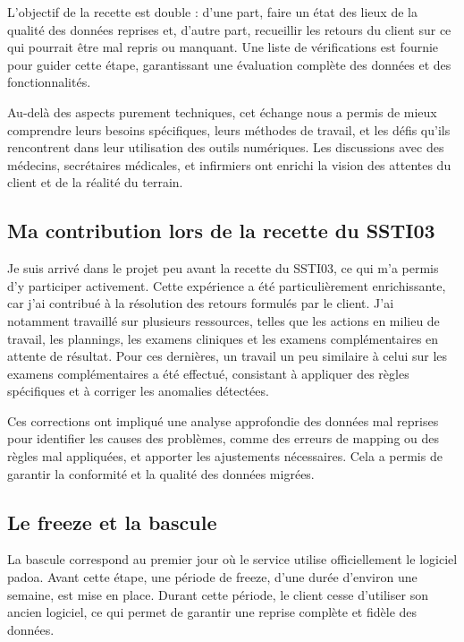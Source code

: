 L’objectif de la recette est double : d’une part, faire un état des lieux de la qualité des données reprises et, d’autre part, recueillir les retours du client sur ce qui pourrait être mal repris ou manquant. Une liste de vérifications est fournie pour guider cette étape, garantissant une évaluation complète des données et des fonctionnalités.

Au-delà des aspects purement techniques, cet échange nous a permis de mieux comprendre leurs besoins spécifiques, leurs méthodes de travail, et les défis qu'ils rencontrent dans leur utilisation des outils numériques. Les discussions avec des médecins, secrétaires médicales, et infirmiers ont enrichi la vision des attentes du client et de la réalité du terrain.

\subsection{Ma contribution lors de la recette du SSTI03}

Je suis arrivé dans le projet peu avant la recette du SSTI03, ce qui m’a permis d’y participer activement. Cette expérience a été particulièrement enrichissante, car j’ai contribué à la résolution des retours formulés par le client. J’ai notamment travaillé sur plusieurs ressources, telles que les actions en milieu de travail, les plannings, les examens cliniques et les examens complémentaires en attente de résultat. Pour ces dernières, un travail un peu similaire à celui sur les examens complémentaires a été effectué, consistant à appliquer des règles spécifiques et à corriger les anomalies détectées.

Ces corrections ont impliqué une analyse approfondie des données mal reprises pour identifier les causes des problèmes, comme des erreurs de mapping ou des règles mal appliquées, et apporter les ajustements nécessaires. Cela a permis de garantir la conformité et la qualité des données migrées.

\subsection{Le freeze et la bascule}

La bascule correspond au premier jour où le service utilise officiellement le logiciel padoa. Avant cette étape, une période de freeze, d’une durée d’environ une semaine, est mise en place. Durant cette période, le client cesse d’utiliser son ancien logiciel, ce qui permet de garantir une reprise complète et fidèle des données.

